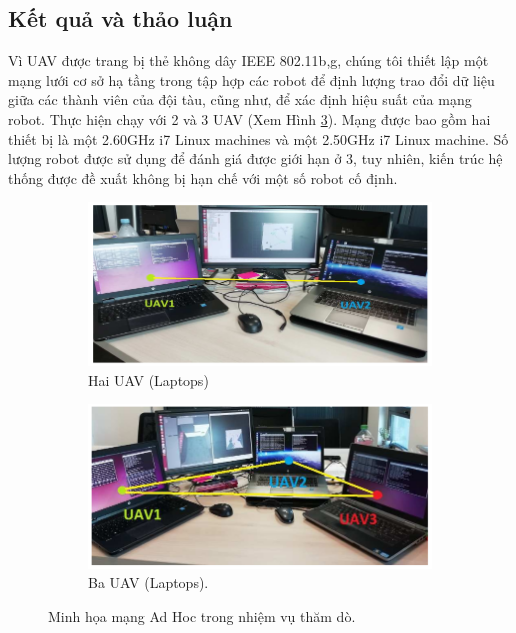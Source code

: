 \documentclass[11pt,openany]{book}
\begin{document}
\subsection{Kết quả và thảo luận}
Vì UAV được trang bị thẻ không dây IEEE 802.11b,g, chúng tôi thiết lập một mạng lưới cơ sở hạ tầng trong tập hợp các robot để định lượng trao đổi dữ liệu giữa các thành viên của đội tàu, cũng như, để xác định hiệu suất của mạng robot. Thực hiện chạy với 2 và 3 UAV (Xem Hình \ref{fig:4.7}). Mạng được bao gồm hai thiết bị là một 2.60GHz i7 Linux machines và một 2.50GHz i7 Linux machine. Số lượng robot được sử dụng để đánh giá được giới hạn ở 3, tuy nhiên, kiến trúc hệ thống được đề xuất không bị hạn chế với một số robot cố định.
\begin{figure}[H]
    \centering
    \begin{subfigure}[H]{0.7\linewidth}
        \includegraphics[width=\linewidth]{assets/4_7_a.png}
        \caption{{Hai UAV (Laptops)}}
        \label{fig:4.7a}
    \end{subfigure}
    \begin{subfigure}[H]{0.7\linewidth}
        \includegraphics[width=\linewidth]{assets/4_7_b.png}
        \caption{{Ba UAV (Laptops).}}
        \label{fig:4.7b}
    \end{subfigure}
    \caption{Minh họa mạng Ad Hoc trong nhiệm vụ thăm dò.}
    \label{fig:4.7}
\end{figure}
\end{document}
